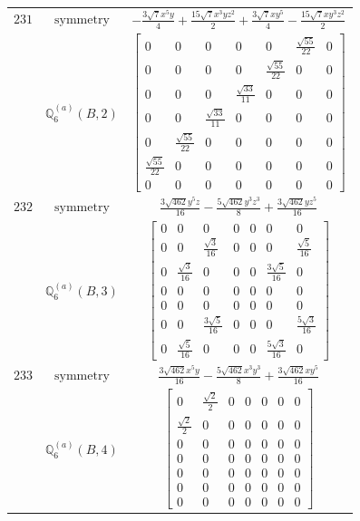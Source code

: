 \documentclass[fleqn,8pt,landscape]{jsarticle}
\begin{document}
\begin{longtable}{ccc}
$ 231 $ & $ \text{symmetry} $ & $ - \frac{3 \sqrt{7} x^{5} y}{4} + \frac{15 \sqrt{7} x^{3} y z^{2}}{2} + \frac{3 \sqrt{7} x y^{5}}{4} - \frac{15 \sqrt{7} x y^{3} z^{2}}{2} $ \\
$  $ & $ \mathbb{Q}_{6}^{(a)}(B,2) $ & $ \begin{bmatrix} 0 & 0 & 0 & 0 & 0 & \frac{\sqrt{55}}{22} & 0 \\ 0 & 0 & 0 & 0 & \frac{\sqrt{55}}{22} & 0 & 0 \\ 0 & 0 & 0 & \frac{\sqrt{33}}{11} & 0 & 0 & 0 \\ 0 & 0 & \frac{\sqrt{33}}{11} & 0 & 0 & 0 & 0 \\ 0 & \frac{\sqrt{55}}{22} & 0 & 0 & 0 & 0 & 0 \\ \frac{\sqrt{55}}{22} & 0 & 0 & 0 & 0 & 0 & 0 \\ 0 & 0 & 0 & 0 & 0 & 0 & 0 \end{bmatrix} $ \\ \hline
$ 232 $ & $ \text{symmetry} $ & $ \frac{3 \sqrt{462} y^{5} z}{16} - \frac{5 \sqrt{462} y^{3} z^{3}}{8} + \frac{3 \sqrt{462} y z^{5}}{16} $ \\
$  $ & $ \mathbb{Q}_{6}^{(a)}(B,3) $ & $ \begin{bmatrix} 0 & 0 & 0 & 0 & 0 & 0 & 0 \\ 0 & 0 & \frac{\sqrt{3}}{16} & 0 & 0 & 0 & \frac{\sqrt{5}}{16} \\ 0 & \frac{\sqrt{3}}{16} & 0 & 0 & 0 & \frac{3 \sqrt{5}}{16} & 0 \\ 0 & 0 & 0 & 0 & 0 & 0 & 0 \\ 0 & 0 & 0 & 0 & 0 & 0 & 0 \\ 0 & 0 & \frac{3 \sqrt{5}}{16} & 0 & 0 & 0 & \frac{5 \sqrt{3}}{16} \\ 0 & \frac{\sqrt{5}}{16} & 0 & 0 & 0 & \frac{5 \sqrt{3}}{16} & 0 \end{bmatrix} $ \\ \hline
$ 233 $ & $ \text{symmetry} $ & $ \frac{3 \sqrt{462} x^{5} y}{16} - \frac{5 \sqrt{462} x^{3} y^{3}}{8} + \frac{3 \sqrt{462} x y^{5}}{16} $ \\
$  $ & $ \mathbb{Q}_{6}^{(a)}(B,4) $ & $ \begin{bmatrix} 0 & \frac{\sqrt{2}}{2} & 0 & 0 & 0 & 0 & 0 \\ \frac{\sqrt{2}}{2} & 0 & 0 & 0 & 0 & 0 & 0 \\ 0 & 0 & 0 & 0 & 0 & 0 & 0 \\ 0 & 0 & 0 & 0 & 0 & 0 & 0 \\ 0 & 0 & 0 & 0 & 0 & 0 & 0 \\ 0 & 0 & 0 & 0 & 0 & 0 & 0 \\ 0 & 0 & 0 & 0 & 0 & 0 & 0 \end{bmatrix} $ \\ \hline

\end{longtable}
\end{document}
